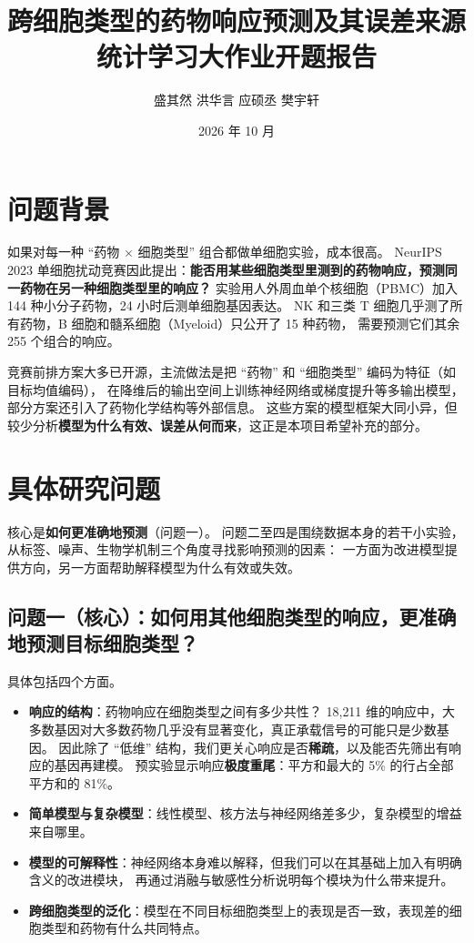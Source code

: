 \documentclass[11pt,a4paper]{article}
\title{\bfseries 跨细胞类型的药物响应预测及其误差来源\\[0.3em]
\large 统计学习大作业开题报告}
\author{盛其然 \quad 洪华言 \quad 应硕丞 \quad 樊宇轩}
\date{2026 年 10 月}
\begin{document}
\vspace*{-2.5em}
{\let\newpage\relax\maketitle}
\vspace*{-1.5em}

\section{问题背景}

如果对每一种 ``药物 $\times$ 细胞类型'' 组合都做单细胞实验，成本很高。
NeurIPS 2023 单细胞扰动竞赛因此提出：\textbf{能否用某些细胞类型里测到的药物响应，预测同一药物在另一种细胞类型里的响应？}
实验用人外周血单个核细胞（PBMC）加入 144 种小分子药物，24 小时后测单细胞基因表达。
NK 和三类 T 细胞几乎测了所有药物，B 细胞和髓系细胞（Myeloid）只公开了 15 种药物，
需要预测它们其余 255 个组合的响应。

竞赛前排方案大多已开源，主流做法是把 ``药物'' 和 ``细胞类型'' 编码为特征（如目标均值编码），
在降维后的输出空间上训练神经网络或梯度提升等多输出模型，部分方案还引入了药物化学结构等外部信息。
这些方案的模型框架大同小异，但较少分析\textbf{模型为什么有效、误差从何而来}，这正是本项目希望补充的部分。

\section{具体研究问题}

核心是\textbf{如何更准确地预测}（问题一）。
问题二至四是围绕数据本身的若干小实验，从标签、噪声、生物学机制三个角度寻找影响预测的因素：
一方面为改进模型提供方向，另一方面帮助解释模型为什么有效或失效。

\subsection*{问题一（核心）：如何用其他细胞类型的响应，更准确地预测目标细胞类型？}
具体包括四个方面。
\begin{itemize}
\item \textbf{响应的结构}：药物响应在细胞类型之间有多少共性？
  18{,}211 维的响应中，大多数基因对大多数药物几乎没有显著变化，真正承载信号的可能只是少数基因。
  因此除了 ``低维'' 结构，我们更关心响应是否\textbf{稀疏}，以及能否先筛出有响应的基因再建模。
  预实验显示响应\textbf{极度重尾}：平方和最大的 5\% 的行占全部平方和的 81\%。
\item \textbf{简单模型与复杂模型}：线性模型、核方法与神经网络差多少，复杂模型的增益来自哪里。
\item \textbf{模型的可解释性}：神经网络本身难以解释，但我们可以在其基础上加入有明确含义的改进模块，
  再通过消融与敏感性分析说明每个模块为什么带来提升。
\item \textbf{跨细胞类型的泛化}：模型在不同目标细胞类型上的表现是否一致，表现差的细胞类型和药物有什么共同特点。
\end{itemize}
\end{document}
